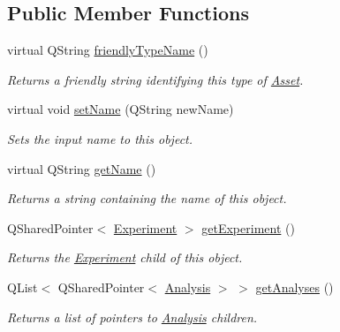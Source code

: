 \subsection*{Public Member Functions}
\begin{DoxyCompactItemize}
\item 
virtual Q\-String \hyperlink{class_picto_1_1_picto_data_a88086b3dc71b030ba09c55953c605a4a}{friendly\-Type\-Name} ()
\begin{DoxyCompactList}\small\item\em Returns a friendly string identifying this type of \hyperlink{class_picto_1_1_asset}{Asset}. \end{DoxyCompactList}\item 
virtual void \hyperlink{class_picto_1_1_picto_data_a02af7ffbee30fc04bb0d3c5792e16188}{set\-Name} (Q\-String new\-Name)
\begin{DoxyCompactList}\small\item\em Sets the input name to this object. \end{DoxyCompactList}\item 
\hypertarget{class_picto_1_1_picto_data_a84bc32baffb2746990d38083e361aab1}{virtual Q\-String \hyperlink{class_picto_1_1_picto_data_a84bc32baffb2746990d38083e361aab1}{get\-Name} ()}\label{class_picto_1_1_picto_data_a84bc32baffb2746990d38083e361aab1}

\begin{DoxyCompactList}\small\item\em Returns a string containing the name of this object. \end{DoxyCompactList}\item 
Q\-Shared\-Pointer$<$ \hyperlink{class_picto_1_1_experiment}{Experiment} $>$ \hyperlink{class_picto_1_1_picto_data_a586cc4820a47b2cc0ab0a0c5a3273e06}{get\-Experiment} ()
\begin{DoxyCompactList}\small\item\em Returns the \hyperlink{class_picto_1_1_experiment}{Experiment} child of this object. \end{DoxyCompactList}\item 
Q\-List$<$ Q\-Shared\-Pointer$<$ \hyperlink{class_picto_1_1_analysis}{Analysis} $>$ $>$ \hyperlink{class_picto_1_1_picto_data_a2019b9aceb8ef5a478a21af3aa2b8cf4}{get\-Analyses} ()
\begin{DoxyCompactList}\small\item\em Returns a list of pointers to \hyperlink{class_picto_1_1_analysis}{Analysis} children. \end{DoxyCompactList}\end{DoxyCompactItemize}
